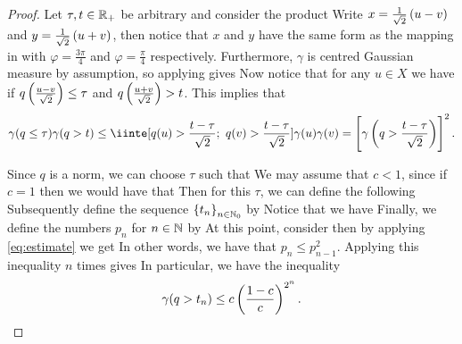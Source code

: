 \documentclass[../main.tex]{subfiles}
\begin{document}
\begin{proof}
Let $\tau, t\in\operatorname{\mathbb{R}}_+$ be arbitrary and consider the product  Write $x = \frac{1}{\sqrt{2}}\del{u-v}$ and $y = \frac{1}{\sqrt{2}}\del{u+v}$, then notice that $x$ and $y$ have the same form as the mapping in  with $\varphi = \frac{3\pi}{4}$ and $\varphi = \frac{\pi}{4}$ respectively. Furthermore, $\gamma$ is centred Gaussian measure by assumption, so applying  gives  Now notice that for any $u\in X$ we have  if $q\del{\frac{u-v}{\sqrt{2}}}\leq\tau$ and $q\del{\frac{u+v}{\sqrt{2}}}>t$. This implies that
\begin{equation}
    \label{eq:estimate}
    \gamma(q\leq\tau)\gamma(q>t)\leq\iinte[q(u)>\frac{t-\tau}{\sqrt{2}}; \ q(v)>\frac{t-\tau}{\sqrt{2}}]{}{\gamma(u)}{\gamma(v)} = \sbr{\gamma\del{q>\frac{t-\tau}{\sqrt{2}}}}^2.
\end{equation}

Since $q$ is a norm, we can choose $\tau$ such that  We may assume that $c<1$, since if $c = 1$ then we would have that  Then for this $\tau$, we can define the following  Subsequently define the sequence $\cbr{t_n}_{n\in\N_0}$ by  Notice that we have  Finally, we define the numbers $p_n$ for $n\in\operatorname{\mathbb{N}}$ by  At this point, consider  then by applying \eqref{eq:estimate} we get  In other words, we have that $p_n\leq p_{n-1}^2$. Applying this inequality $n$ times gives  In particular, we have the inequality
\begin{equation}
    \label{eq:gamma_bound}
    \gamma(q>t_n) \leq c\del{\frac{1-c}{c}}^{2^n}.
\end{equation}


\end{proof}
\end{document}
